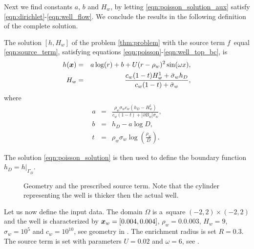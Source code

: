 Next we find constants $a$, $b$ and $H_w$, by letting \eqref{eqn:poisson_solution_aux} satisfy \eqref{eqn:dirichlet}-\eqref{eqn:well_flow}.
We conclude the results in the following definition of the complete solution.
\begin{definition} \label{def:solution}
The solution $[h,H_w]$ of the problem \ref{thm:problem}
with the source term $f$~equal \eqref{eqn:source_term},
satisfying equations \eqref{eqn:poisson}-\eqref{eqn:well_top_bc}, is
\begin{eqnarray}
  h(\mathbf{\boldsymbol{x}}) &=& a\log(r) + b + U(r-\rho_w)^2 \sin(\omega x), \label{eqn:poisson_solution}\\
  H_w &=& \frac{c_w(1-t) H^1_w + \bar{\sigma}_w h_D}{c_w(1-t) + \bar{\sigma}_w}, \label{eqn:well_solution}
\end{eqnarray}
where
\begin{eqnarray}
  a &=& \frac{\rho_w\sigma_w c_w (h_D-H^1_w)}{c_w(1-t) + |\partial B_w|\sigma_w}, \nonumber \\
  b &=& h_D - a\log D, \nonumber \\
  t &=& \rho_w\sigma_w\log\left(\frac{\rho_w}{D}\right). \nonumber
\end{eqnarray}
\end{definition}

The solution \eqref{eqn:poisson_solution} is then used to define the boundary function $h_D = h|_{\Gamma_D}$.

\begin{figure}[!htb]
  \centering    
  \hspace{5pt}
  \caption[]
  {Geometry and the prescribed source term. Note that the cylinder representing the well is thicker then the actual well.}
\end{figure}

Let us now define the input data. The domain $\Omega$ is a~square $(-2,2)\times(-2,2)$ and the well is characterized by 
$\mathbf{\boldsymbol{x}}_w=[0.004,0.004]$,  $\rho_w=0.0.003$, $H_w=9$, $\sigma_w=10^5$ and $c_w=10^{10}$, see geometry in . 
The enrichment radius is set $R=0.3$.
The source term is set with parameters $U=0.02$ and $\omega=6$, see .

